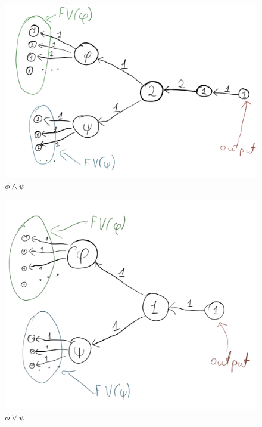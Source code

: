 \noindent
\begin{figure}[H]
      \centering
      \caption{$\phi \land \psi$}
      \includegraphics[scale=0.15]{content/graphics/game10.png}
\end{figure}

\noindent
\begin{figure}[H]
      \centering
      \caption{$\phi \lor \psi$}
      \includegraphics[scale=0.15]{content/graphics/game11.png}
\end{figure}

